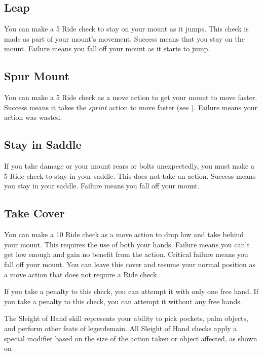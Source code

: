     \subsection{Leap}
        You can make a  5 Ride check to stay on your mount as it jumps. This check is made as part of your mount's movement. Success means that you stay on the mount. Failure means you fall off your mount as it starts to jump.

    \subsection{Spur Mount}
        You can make a  5 Ride check as a move action to get your mount to move faster. Success means it takes the \textit{sprint} action to move faster (see ).
        Failure means your action was wasted.

    \subsection{Stay in Saddle}
        If you take damage or your mount rears or bolts unexpectedly, you must make a  5 Ride check to stay in your saddle. This does not take an action. Success means you stay in your saddle. Failure means you fall off your mount.

    \subsection{Take Cover}
        You can make a  10 Ride check as a move action to drop low and take  behind your mount. This requires the use of both your hands. Failure means you can't get low enough and gain no benefit from the action. Critical failure means you fall off your mount. You can leave this cover and resume your normal position as a move action that does not require a Ride check.

        If you take a  penalty to this check, you can attempt it with only one free hand.
        If you take a  penalty to this check, you can attempt it without any free hands.

\newpage
{}
        The Sleight of Hand skill represents your ability to pick pockets, palm objects, and perform other feats of legerdemain.
        All Sleight of Hand checks apply a special modifier based on the size of the action taken or object affected, as shown on .

